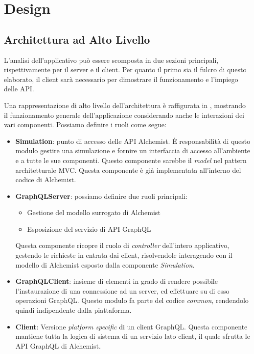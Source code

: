 \chapter{Design}\label{chap:design}
\section{Architettura ad Alto Livello}\label{sec:architecture}
L'analisi dell'applicativo può essere scomposta in due sezioni principali, rispettivamente per il server e il client.
Per quanto il primo sia il fulcro di questo elaborato, il client sarà necessario per dimostrare il funzionamento e l'impiego delle API.

Una rappresentazione di alto livello dell'architettura è raffigurata in , mostrando il funzionamento generale dell'applicazione
considerando anche le interazioni dei vari componenti.
Possiamo definire i ruoli come segue:
\begin{itemize}
    \item \textbf{Simulation}: punto di accesso delle API Alchemist. È responsabilità di questo modulo gestire una simulazione e fornire un interfaccia
        di accesso all'ambiente e a tutte le sue componenti. Questo componente sarebbe il \textit{model} nel pattern architetturale \ac{MVC}. Questa
        componente è già implementata all'interno del codice di Alchemist.
    \item \textbf{GraphQLServer}: possiamo definire due ruoli principali: \begin{itemize}
            \item Gestione del modello surrogato di Alchemist
            \item Esposizione del servizio di API GraphQL
        \end{itemize}
        Questa componente ricopre il ruolo di \textit{controller} dell'intero applicativo, gestendo le richieste in entrata dai client, risolvendole
        interagendo con il modello di Alchemist esposto dalla componente \textit{Simulation}.
    \item \textbf{GraphQLClient}: insieme di elementi in grado di rendere possibile l'instaurazione di una connessione ad un server, ed effettuare su
        di esso operazioni GraphQL. Questo modulo fa parte del codice \textit{common}, rendendolo quindi indipendente dalla piattaforma.
    \item \textbf{Client}: Versione \textit{platform specific} di un client GraphQL. Questa componente mantiene tutta la logica di sistema di un
        servizio lato client, il quale sfrutta le API GraphQL di Alchemist.
\end{itemize}

